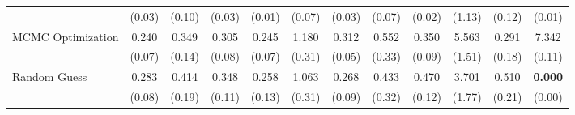 \begin{table}[ht]
{\begin{tabular}{l cccc cccc cc c}
             & (0.03) & (0.10) & (0.03) & (0.01) & (0.07) & (0.03) & (0.07) & (0.02) & (1.13) & (0.12) & (0.01) \\
            \addlinespace[0.2em]
            MCMC Optimization & 0.240 & 0.349 & 0.305 & 0.245 & 1.180 & 0.312 & 0.552 & 0.350 & 5.563 & 0.291 & 7.342 \\
             & (0.07) & (0.14) & (0.08) & (0.07) & (0.31) & (0.05) & (0.33) & (0.09) & (1.51) & (0.18) & (0.11) \\
            \addlinespace[0.2em]
            Random Guess & 0.283 & 0.414 & 0.348 & 0.258 & 1.063 & 0.268 & 0.433 & 0.470 & 3.701 & 0.510 & \textbf{0.000} \\
             & (0.08) & (0.19) & (0.11) & (0.13) & (0.31) & (0.09) & (0.32) & (0.12) & (1.77) & (0.21) & (0.00) \\
            \bottomrule
        \end{tabular}%
    }
\end{table}